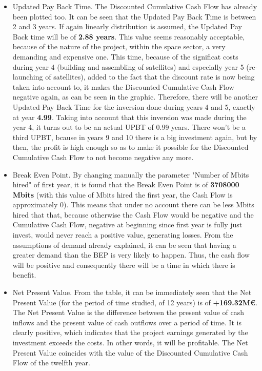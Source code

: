 \begin{itemize}
\item Updated Pay Back Time. The Discounted Cumulative Cash Flow has already been plotted too. It can be seen that the Updated Pay Back Time is between 2 and 3 years. If again linearly distribution is assumed, the Updated Pay Back time will be of \textbf{2.88 years}. This value seems reasonably acceptable, because of the nature of the project, within the space sector, a very demanding and expensive one.
This time, because of the significat costs during year 4 (building and assembling of satellites) and especially year 5 (re-launching of satellites), added to the fact that the discount rate is now being taken into account to, it makes the Discounted Cumulative Cash Flow negative again, as can be seen in the graphic. Therefore, there will be another Updated Pay Back Time for the inversion done during years 4 and 5, exactly at year \textbf{4.99}. Taking into account that this inversion was made during the year 4, it turns out to be an actual UPBT of 0.99 years. There won't be a third UPBT, bcause in years 9 and 10 there is a big investment again, but by then, the profit is high enough so as to make it possible for the Discounted Cumulative Cash Flow to not become negative any more. 


\item Break Even Point. By changing manually the parameter "Number of Mbits hired" of first year, it is found that the Break Even Point is of \textbf{3708000 Mbits} (with this value of Mbits hired the first year, the Cash Flow is approximately 0). This means that under no account there can be less Mbits hired that that, because otherwise the Cash Flow would be negative and the Cumulative Cash Flow, negative at beginning since first year is fully just invest, would never reach a positive value, generating losses. From the assumptions of demand already explained, it can be seen that having a greater demand than the BEP is very likely to happen. Thus, the cash flow will be positive and consequently there will be a time in which there is benefit.

\item Net Present Value. From the table, it can be immediately seen that the Net Present Value (for the period of time studied, of 12 years) is of \textbf{+169.32M\euro}. The Net Present Value is the difference between the present value of cash inflows and the present value of cash outflows over a period of time. It is clearly positive, which indicates that the project earnings generated by the investment exceeds the costs. In other words, it will be profitable. The Net Present Value coincides with the value of the Discounted Cumulative Cash Flow of the twelfth year. 



\end{itemize}
